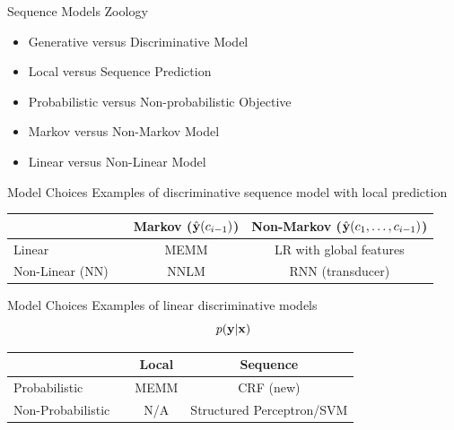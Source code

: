 \documentclass{beamer}
\begin{document}

\begin{frame}{Sequence Models Zoology}
  \begin{itemize}

  \item Generative versus Discriminative Model
    \air 
  \item Local versus Sequence Prediction
    \air 
  \item Probabilistic versus Non-probabilistic Objective
    \air 
  \item Markov versus Non-Markov Model
    \air 
  \item Linear versus Non-Linear Model
  \end{itemize}
\end{frame}

\begin{frame}{Model Choices}
  Examples of discriminative sequence model with local prediction
  \air 

  \begin{center}
    \begin{tabular}{llcc}
      \toprule
       && Markov ($\hat{\mathbf{y}}(c_{i-1})$) & Non-Markov ($\hat{\mathbf{y}}(c_1, \ldots, c_{i-1})$) \\ 
      \midrule
      Linear &&  MEMM &  LR with global features  \\ 
      Non-Linear (NN) && NNLM &  RNN (transducer) \\ 
      \bottomrule
    \end{tabular}
  \end{center}
\end{frame}




\begin{frame}{Model Choices}
  Examples of linear discriminative models   
  \[p(\mathbf{y} | \mathbf{x})\] 
  \begin{center}
    \begin{tabular}{llcc}
      \toprule
      &&  Local & Sequence \\ 
      \midrule
      Probabilistic  && MEMM &  CRF (new) \\ 
      Non-Probabilistic && N/A & Structured Perceptron/SVM \\ 
      \bottomrule
    \end{tabular}
  \end{center}
\end{frame}
\end{document}
